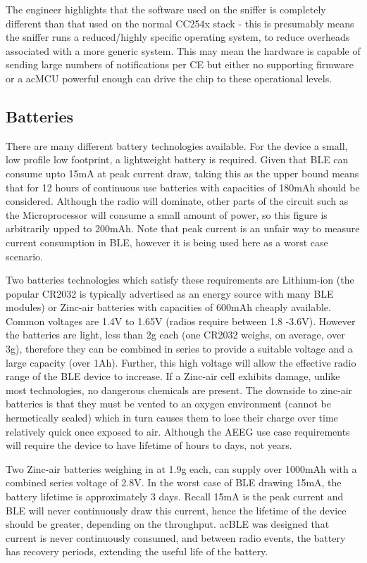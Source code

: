 \documentclass[]{article}
\begin{document}
 The engineer highlights that the software used on the sniffer is completely different than that used on the normal CC254x stack - this is presumably means the sniffer runs a reduced/highly specific operating system, to reduce overheads associated with a more generic system. This may mean the hardware is capable of sending large numbers of notifications per \ac{CE} but either no supporting firmware or a ac{MCU} powerful enough can drive the chip to these operational levels. 

\subsection{Batteries}
There are many different battery technologies available. For the device a small, low profile low footprint, a lightweight battery is required. Given that \ac{BLE} can consume upto 15mA at peak current draw, taking this as the upper bound means that for 12 hours of continuous use batteries with capacities of 180mAh should be considered. Although the radio will dominate, other parts of the circuit such as the Microprocessor will consume a small amount of power, so this figure is arbitrarily upped to 200mAh. Note that peak current is an unfair way to measure current consumption in \ac{BLE}, however it is being used here as a worst case scenario. 

Two batteries technologies which satisfy these requirements are Lithium-ion (the popular CR2032 is typically advertised as an energy source with many \ac{BLE} modules) or Zinc-air batteries with capacities of 600mAh cheaply available. Common voltages are 1.4V to 1.65V (radios require between 1.8 -3.6V). However the batteries are light, less than 2g each (one CR2032 weighs, on average, over 3g), therefore they can be combined in series to provide a suitable voltage and a large capacity (over 1Ah). Further, this high voltage will allow the effective radio range of the \ac{BLE} device to increase. If a Zinc-air cell exhibits damage, unlike most technologies, no dangerous chemicals are present. The downside to zinc-air batteries is that they must be vented to an oxygen environment (cannot be hermetically sealed) which in turn causes them to lose their charge over time relatively quick once exposed to air. Although the \ac{AEEG} use case requirements will require the device to have lifetime of hours to days, not years. 

Two Zinc-air batteries weighing in at 1.9g each, can supply over 1000mAh with a combined series voltage of 2.8V. In the worst case of BLE drawing 15mA, the battery lifetime is approximately 3 days. Recall 15mA is the peak current and BLE will never continuously draw this current, hence the lifetime of the device should be greater, depending on the throughput. ac{BLE} was designed that current is never continuously consumed, and between radio events, the battery has recovery periods, extending the useful life of the battery.
\end{document}
